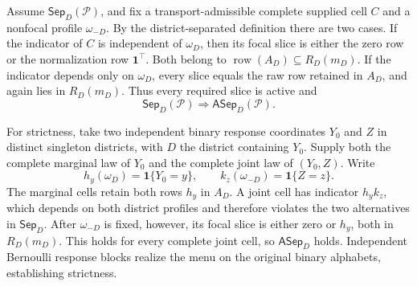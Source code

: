 Assume \(\mathsf{Sep}_D(\mathcal P)\), and fix a transport-admissible complete supplied cell \(C\) and a nonfocal profile \(\omega_{-D}\). By the district-separated definition there are two cases. If the indicator of \(C\) is independent of \(\omega_D\), then its focal slice is either the zero row or the normalization row \(\mathbf1^\top\). Both belong to \(\operatorname{row}(A_D)\subseteq R_D(m_D)\). If the indicator depends only on \(\omega_D\), every slice equals the raw row retained in \(A_D\), and again lies in \(R_D(m_D)\). Thus every required slice is active and
\[
\mathsf{Sep}_D(\mathcal P)\Longrightarrow\mathsf{ASep}_D(\mathcal P).\tag{1}
\]

For strictness, take two independent binary response coordinates \(Y_0\) and \(Z\) in distinct singleton districts, with \(D\) the district containing \(Y_0\). Supply both the complete marginal law of \(Y_0\) and the complete joint law of \((Y_0,Z)\). Write
\[
h_y(\omega_D)=\mathbf1\{Y_0=y\},\qquad
k_z(\omega_{-D})=\mathbf1\{Z=z\}.
\]
The marginal cells retain both rows \(h_y\) in \(A_D\). A joint cell has indicator \(h_yk_z\), which depends on both district profiles and therefore violates the two alternatives in \(\mathsf{Sep}_D\). After \(\omega_{-D}\) is fixed, however, its focal slice is either zero or \(h_y\), both in \(R_D(m_D)\). This holds for every complete joint cell, so \(\mathsf{ASep}_D\) holds. Independent Bernoulli response blocks realize the menu on the original binary alphabets, establishing strictness.